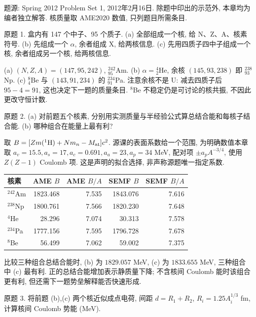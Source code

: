题源: Spring 2012 Problem Set 1, 2012年2月16日. 除题中印出的示范外, 本章均为编者独立解答. 核质量取 AME2020 数值, 只列题目所需条目.
\begin{exercise}\label{ex:2202-1-1}
原题 1. 盒内有 147 个中子、95 个质子. (a) 全部组成一个核, 给 N、Z、A、核素符号. (b) 先组成一个 $\alpha$, 余者组成 X, 给两核信息. (c) 先用四质子四中子组成一个核, 余者组成另一个核, 给两核信息.
\end{exercise}
\begin{solution}
(a) $(N,Z,A)=(147,95,242)$, ${}^{242}_{95}$Am. (b) $\alpha={}^4_2$He, 余核 $(145,93,238)$ 即 ${}^{238}_{93}$Np. (c) ${}^8_4$Be 与 $(143,91,234)$ 的 ${}^{234}_{91}$Pa. 注意余核不是 U: 减去四质子后 $95-4=91$, 这也决定下一题的质量条目. ${}^8$Be 不稳定仍是可讨论的核共振, 不因此更改守恒计数.
\end{solution}
\begin{exercise}\label{ex:2202-1-2}
原题 2. (a) 对前题五个核素, 分别用实测质量与半经验公式算总结合能和每核子结合能. (b) 哪种组合在能量上最有利?
\end{exercise}
\begin{solution}
取 $B=[Zm({}^1\mathrm H)+Nm_n-M_{\rm at}]c^2$. 源课的表面系数给一个范围, 为明确数值本章取 $a_v=15.5,a_s=17,a_c=0.691,a_a=23,a_p=34$ MeV, 配对项 $\pm a_pA^{-3/4}$, 使用 $Z(Z-1)$ Coulomb 项. 这是声明的拟合选择, 非声称源题唯一指定系数.
\begin{center}\begin{tabular}{lrrrr}\toprule
核素&AME $B$&AME $B/A$&SEMF $B$&SEMF $B/A$\\\midrule
${}^{242}$Am&1823.468&7.535&1843.076&7.616\\
${}^{238}$Np&1800.761&7.566&1820.230&7.648\\
${}^4$He&28.296&7.074&30.313&7.578\\
${}^{234}$Pa&1777.156&7.595&1796.728&7.678\\
${}^8$Be&56.499&7.062&59.002&7.375\\\bottomrule
\end{tabular}\end{center}
比较三种组合总结合能时, (b) 为 $1829.057$ MeV, (c) 为 $1833.655$ MeV, 三种组合中 (c) 最有利. 正的总结合能增加表示静质量下降; 不含核间 Coulomb 能时该组合更有利, 但还需下一题势垒解释能否快速形成.
\end{solution}
\begin{exercise}\label{ex:2202-1-3}
原题 3. 将前题 (b),(c) 两个核近似成点电荷, 间距 $d=R_1+R_2$, $R_i=1.25A_i^{1/3}$ fm, 计算核间 Coulomb 势能 (MeV).
\end{exercise}
